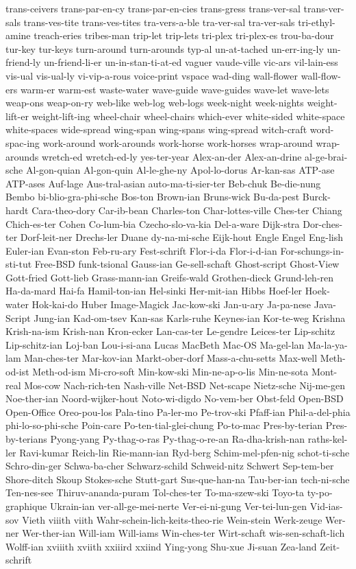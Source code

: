 {trans-ceivers
trans-par-en-cy
trans-par-en-cies
trans-gress
trans-ver-sal
trans-ver-sals
trans-ves-tite
trans-ves-tites
tra-vers-a-ble
tra-ver-sal
tra-ver-sals
tri-ethyl-amine
treach-eries
tribes-man
trip-let
trip-lets
tri-plex
tri-plex-es
trou-ba-dour
tur-key
tur-keys
turn-around
turn-arounds
typ-al
un-at-tached
un-err-ing-ly
un-friend-ly
un-friend-li-er
un-in-stan-ti-at-ed
vaguer
vaude-ville
vic-ars
vil-lain-ess
vis-ual
vis-ual-ly
vi-vip-a-rous
voice-print
vspace
wad-ding
wall-flower
wall-flow-ers
warm-er
warm-est
waste-water
wave-guide
wave-guides
wave-let
wave-lets
weap-ons
weap-on-ry
web-like
web-log
web-logs
week-night
week-nights
weight-lift-er
weight-lift-ing
wheel-chair
wheel-chairs
which-ever
white-sided
white-space
white-spaces
wide-spread
wing-span
wing-spans
wing-spread
witch-craft
word-spac-ing
work-around
work-arounds
work-horse
work-horses
wrap-around
wrap-arounds
wretch-ed
wretch-ed-ly
yes-ter-year
Alex-an-der
Alex-an-drine
al-ge-brai-sche
Al-gon-quian
Al-gon-quin
Al-le-ghe-ny
Apol-lo-dorus
Ar-kan-sas
ATP-ase
ATP-ases
Auf-lage
Aus-tral-asian
auto-ma-ti-sier-ter
Beb-chuk
Be-die-nung
Bembo
bi-blio-gra-phi-sche
Bos-ton
Brown-ian
Bruns-wick
Bu-da-pest
Burck-hardt
Cara-theo-dory
Car-ib-bean
Charles-ton
Char-lottes-ville
Ches-ter
Chiang
Chich-es-ter
Cohen
Co-lum-bia
Czecho-slo-va-kia
Del-a-ware
Dijk-stra
Dor-ches-ter
Dorf-leit-ner
Drechs-ler
Duane
dy-na-mi-sche
Eijk-hout
Engle
Engel
Eng-lish
Euler-ian
Evan-ston
Feb-ru-ary
Fest-schrift
Flor-i-da
Flor-i-d-ian
For-schungs-in-sti-tut
Free-BSD
funk-tsional
Gauss-ian
Ge-sell-schaft
Ghost-script
Ghost-View
Gott-fried
Gott-lieb
Grass-mann-ian
Greifs-wald
Grothen-dieck
Grund-leh-ren
Ha-da-mard
Hai-fa
Hamil-ton-ian
Hel-sinki
Her-mit-ian
Hibbs
Hoef-ler
Hoek-water
Hok-kai-do
Huber
Image-Magick
Jac-kow-ski
Jan-u-ary
Ja-pa-nese
Java-Script
Jung-ian
Kad-om-tsev
Kan-sas
Karls-ruhe
Keynes-ian
Kor-te-weg
Krishna
Krish-na-ism
Krish-nan
Kron-ecker
Lan-cas-ter
Le-gendre
Leices-ter
Lip-schitz
Lip-schitz-ian
Loj-ban
Lou-i-si-ana
Lucas
MacBeth
Mac-OS
Ma-gel-lan
Ma-la-ya-lam
Man-ches-ter
Mar-kov-ian
Markt-ober-dorf
Mass-a-chu-setts
Max-well
Meth-od-ist
Meth-od-ism
Mi-cro-soft
Min-kow-ski
Min-ne-ap-o-lis
Min-ne-sota
Mont-real
Mos-cow
Nach-rich-ten
Nash-ville
Net-BSD
Net-scape
Nietz-sche
Nij-me-gen
Noe-ther-ian
Noord-wijker-hout
Noto-wi-digdo
No-vem-ber
Obst-feld
Open-BSD
Open-Office
Oreo-pou-los
Pala-tino
Pa-ler-mo
Pe-trov-ski
Pfaff-ian
Phil-a-del-phia
phi-lo-so-phi-sche
Poin-care
Po-ten-tial-glei-chung
Po-to-mac
Pres-by-terian
Pres-by-terians
Pyong-yang
Py-thag-o-ras
Py-thag-o-re-an
Ra-dha-krish-nan
raths-kel-ler
Ravi-kumar
Reich-lin
Rie-mann-ian
Ryd-berg
Schim-mel-pfen-nig
schot-ti-sche
Schro-din-ger
Schwa-ba-cher
Schwarz-schild
Schweid-nitz
Schwert
Sep-tem-ber
Shore-ditch
Skoup
Stokes-sche
Stutt-gart
Sus-que-han-na
Tau-ber-ian
tech-ni-sche
Ten-nes-see
Thiruv-ananda-puram
Tol-ches-ter
To-ma-szew-ski
Toyo-ta
ty-po-graphique
Ukrain-ian
ver-all-ge-mei-nerte
Ver-ei-ni-gung
Ver-tei-lun-gen
Vid-ias-sov
Vieth
viiith
viith
Wahr-schein-lich-keits-theo-rie
Wein-stein
Werk-zeuge
Wer-ner
Wer-ther-ian
Will-iam
Will-iams
Win-ches-ter
Wirt-schaft
wis-sen-schaft-lich
Wolff-ian
xviiith
xviith
xxiiird
xxiind
Ying-yong Shu-xue Ji-suan
Zea-land
Zeit-schrift
}
